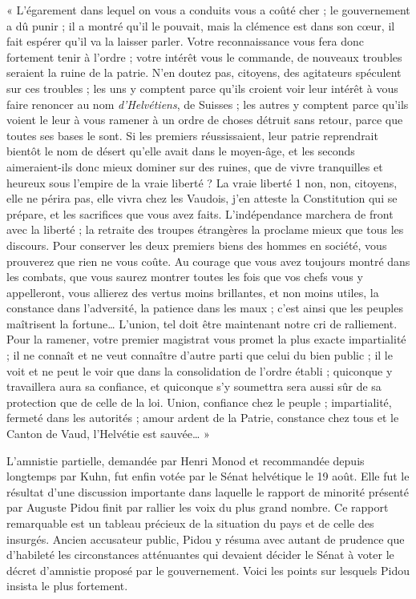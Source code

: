 \documentclass[french,twoside]{book} %
\newenvironment{quoteblock}%
  {\begin{quoting}}
  {\end{quoting}}
\newenvironment{quotebar}{%
    \def\FrameCommand{{\color{rubric!10!}\vrule width 0.5em} \hspace{0.9em}}%
    \def\OuterFrameSep{\itemsep} %
    \MakeFramed {\advance\hsize-\width \FrameRestore}
  }%
  {%
    \endMakeFramed
  }
\renewenvironment{quoteblock}%
  {%
    \savenotes
    \setstretch{0.9}
    \begin{quotebar}
  }
  {%
    \end{quotebar}
    \spewnotes
  }
\begin{document}
\begin{quoteblock}
 \noindent « L’égarement dans lequel on vous a conduits vous a coûté cher ; le gouvernement a dû punir ; il a montré qu’il le pouvait, mais la clémence est dans son cœur, il fait espérer qu’il va la laisser parler. Votre reconnaissance vous fera donc fortement tenir à l’ordre ; votre intérêt vous le commande, de nouveaux troubles seraient la ruine de la patrie. N’en doutez pas, citoyens, des agitateurs spéculent sur ces troubles ; les uns y comptent parce qu’ils croient voir leur intérêt à vous faire renoncer au nom \emph{d’Helvétiens}, de Suisses ; les autres y comptent parce qu’ils voient le leur à vous ramener à un ordre de choses détruit sans retour, parce que toutes ses bases le sont. Si les premiers réussissaient, leur patrie reprendrait bientôt le nom de désert qu’elle avait dans le moyen-âge, et les seconds aimeraient-ils donc mieux dominer sur des ruines, que de vivre tranquilles et heureux sous l’empire de la vraie liberté ? La vraie liberté 1 non, non, citoyens, elle ne périra pas, elle vivra chez les Vaudois, j’en atteste la Constitution qui se prépare, et les sacrifices que vous avez faits. L’indépendance marchera de front avec la liberté ; la retraite des troupes étrangères la proclame mieux que tous les discours. Pour conserver les deux premiers biens des hommes en société, vous prouverez que rien ne vous coûte. Au courage que vous avez toujours montré dans les combats, que vous saurez montrer toutes les fois que vos chefs vous y appelleront, vous allierez des vertus moins brillantes, et non moins utiles, la constance dans l’adversité, la patience dans les maux ; c’est ainsi que les peuples maîtrisent la fortune… L’union, tel doit être maintenant notre cri de ralliement. Pour la ramener, votre premier magistrat vous promet la plus exacte impartialité ; il ne connaît et ne veut connaître d’autre parti que celui du bien public ; il le voit et ne peut le voir que dans la consolidation de l’ordre établi ; quiconque y travaillera aura sa confiance, et quiconque s’y soumettra sera aussi sûr de sa protection que de celle de la loi. Union, confiance chez le peuple ; impartialité, fermeté dans les autorités ; amour ardent de la Patrie, constance chez tous et le Canton de Vaud, l’Helvétie est sauvée… »
 \end{quoteblock}

\noindent L’amnistie partielle, demandée par Henri Monod et recommandée depuis longtemps par Kuhn, fut enfin votée par le Sénat helvétique le 19 août. Elle fut le résultat d’une discussion importante dans laquelle le rapport de minorité présenté par Auguste Pidou finit par rallier les voix du plus grand nombre. Ce rapport remarquable est un tableau précieux de la situation du pays et de celle des insurgés. Ancien accusateur public, Pidou y résuma avec autant de prudence que d’habileté les circonstances atténuantes qui devaient décider le Sénat à voter le décret d’amnistie proposé par le gouvernement. Voici les points sur lesquels Pidou insista le plus fortement.\par
\end{document}
